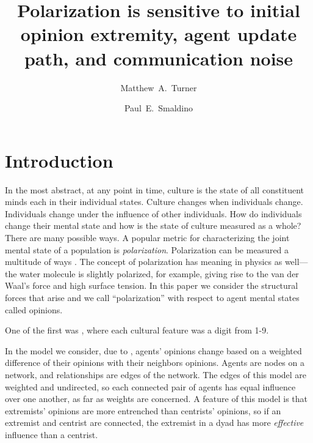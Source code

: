 \documentclass[11pt,letterpaper]{article}
\title{Polarization is sensitive to initial opinion extremity, 
agent update path, and communication noise}
\author[1]{Matthew~A.~Turner}
\author[1]{Paul~E.~Smaldino}
\affil[1]{\footnotesize Cognitive Science Program, University of California, Merced}
\date{}
\begin{document}
\maketitle


\section{Introduction}


In the most abstract, at any point in time, culture is the state of all
constituent minds each in their individual states. Culture changes when 
individuals change. Individuals change under the influence of other 
individuals. How do individuals change their mental state and how is the
state of culture measured as a whole? There are many possible ways. A popular
metric for characterizing the joint mental state 
of a population is \emph{polarization}.
Polarization can be measured a multitude of ways \cite{Bramson2016}. The 
concept of polarization has meaning in physics as well---the water molecule
is slightly polarized, for example, giving rise to the van der Waal's force
and high surface tension. In this paper we consider the structural forces that
arise and we call ``polarization'' with respect to agent mental states called
opinions. 

One of the first was \cite{Axelrod1997}, where each cultural feature was a 
digit from 1-9. 

In the model we consider, due to , agents' opinions
change based on a weighted difference of their opinions with their neighbors
opinions. Agents are nodes on a network, and relationships are edges of the
network. The edges of this model are weighted and undirected, so each 
connected pair of agents has equal influence over one another, as far as
weights are concerned. A feature of this model is that extremists' opinions
are more entrenched than centrists' opinions, so if an extremist and centrist
are connected, the extremist in a dyad has more \emph{effective} influence 
than a centrist. 
\end{document}
